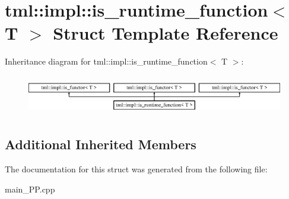 \hypertarget{structtml_1_1impl_1_1is__runtime__function}{\section{tml\+:\+:impl\+:\+:is\+\_\+runtime\+\_\+function$<$ T $>$ Struct Template Reference}
\label{structtml_1_1impl_1_1is__runtime__function}
}
Inheritance diagram for tml\+:\+:impl\+:\+:is\+\_\+runtime\+\_\+function$<$ T $>$\+:\begin{figure}[H]
\begin{center}
\leavevmode
\includegraphics[height=1.786284cm]{structtml_1_1impl_1_1is__runtime__function}
\end{center}
\end{figure}
\subsection*{Additional Inherited Members}


The documentation for this struct was generated from the following file\+:\begin{DoxyCompactItemize}
\item 
main\+\_\+\+P\+P.\+cpp\end{DoxyCompactItemize}
